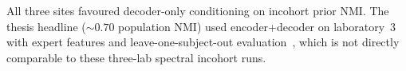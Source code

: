 \label{app:tab:decoder_ablation}

\medskip
\noindent
All three sites favoured decoder-only conditioning on incohort prior NMI.
The thesis headline (${\sim}0.70$ population NMI) used encoder+decoder on laboratory~3 with expert features and leave-one-subject-out evaluation~\cite{elmgreen2026thesis}, which is not directly comparable to these three-lab spectral incohort runs.

